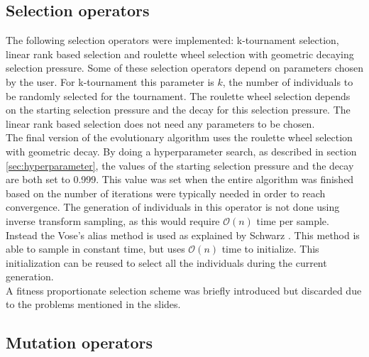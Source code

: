 \documentclass[a4paper,10pt]{article}
\newcommand{\ReplaceMe}[1]{{\color{blue}#1}}
\begin{document}
\subsection{Selection operators}


The following selection operators were implemented: k-tournament selection, linear rank based selection and roulette wheel selection with geometric decaying selection pressure. Some of these selection operators depend on parameters chosen by the user. For k-tournament this parameter is $k$, the number of individuals to be randomly selected for the tournament. The roulette wheel selection depends on the starting selection pressure and the decay for this selection pressure. The linear rank based selection does not need any parameters to be chosen.\\
The final version of the evolutionary algorithm uses the roulette wheel selection with geometric decay. By doing a hyperparameter search, as described in section \ref{sec:hyperparameter}, the values of the starting selection pressure and the decay are both set to 0.999. This value was set when the entire algorithm was finished based on the number of iterations were typically needed in order to reach convergence. The generation of individuals in this operator is not done using inverse transform sampling, as this would require $\mathcal{O}(n)$ time per sample. Instead the Vose's alias method is used as explained by Schwarz \cite{schwarz, vose}. This method is able to sample in constant time, but uses $\mathcal{O}(n)$ time to initialize. This initialization can be reused to select all the individuals during the current generation.\\
A fitness proportionate selection scheme was briefly introduced but discarded due to the problems mentioned in the slides.

\subsection{Mutation operators} \label{sec:mutation}

\end{document}
